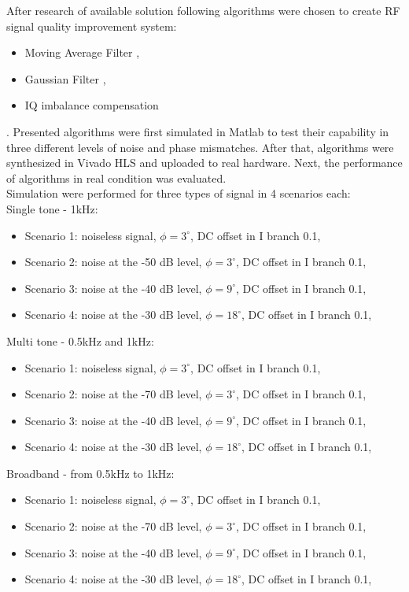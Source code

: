 \documentclass[en,printmode]{mgr}
\begin{document}
	After research of available solution following algorithms were chosen to create RF signal quality improvement system:
	\begin{itemize}
		\item Moving Average Filter \cite{mav},
		\item Gaussian Filter \cite{filter_design},
		\item IQ imbalance compensation \cite{iqcorr}
	\end{itemize}.
	Presented algorithms were first simulated in Matlab to test their capability in
	three different levels of noise and phase mismatches.
	After that, algorithms were synthesized in Vivado HLS and uploaded to real hardware.
	Next, the performance of algorithms in real condition was evaluated.
	\\
		
	Simulation were performed for three types of signal in 4 scenarios each:
	\\
	
	Single tone - 1kHz:
	\begin{itemize}
		\item Scenario 1: noiseless signal, $\phi=3^\circ$, DC offset in I branch 0.1,
		\item Scenario 2: noise at the -50 dB level, $\phi=3^\circ$, DC offset in I branch 0.1,
		\item Scenario 3: noise at the -40 dB level, $\phi=9^\circ$, DC offset in I branch 0.1,
		\item Scenario 4: noise at the -30 dB level, $\phi=18^\circ$, DC offset in I branch 0.1,
	\end{itemize}
	\newpage
	
	Multi tone - 0.5kHz and 1kHz:
	\begin{itemize}
		\item Scenario 1: noiseless signal, $\phi=3^\circ$, DC offset in I branch 0.1,
		\item Scenario 2: noise at the -70 dB level, $\phi=3^\circ$, DC offset in I branch 0.1,
		\item Scenario 3: noise at the -40 dB level, $\phi=9^\circ$, DC offset in I branch 0.1,
		\item Scenario 4: noise at the -30 dB level, $\phi=18^\circ$, DC offset in I branch 0.1,
	\end{itemize}
	\vspace{0.5cm}
	Broadband - from 0.5kHz to 1kHz:
	\begin{itemize}
		\item Scenario 1: noiseless signal, $\phi=3^\circ$, DC offset in I branch 0.1,
		\item Scenario 2: noise at the -70 dB level, $\phi=3^\circ$, DC offset in I branch 0.1,
		\item Scenario 3: noise at the -40 dB level, $\phi=9^\circ$, DC offset in I branch 0.1,
		\item Scenario 4: noise at the -30 dB level, $\phi=18^\circ$, DC offset in I branch 0.1,
	\end{itemize}
		
\end{document}
